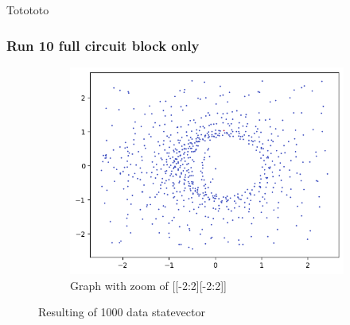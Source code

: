 Totototo

\subsubsection{Run 10 full circuit block only}
\begin{figure}[ht!]
        \centering
        \begin{subfigure}[c]{0.5\textwidth}
                \includegraphics[width=\textwidth]{Chapitre1/Figures/exp1_10_base0_zoom.png}
                \caption{Graph with zoom of [[-2:2][-2:2]]}
        \end{subfigure}%
        \caption{Resulting of 1000 data statevector}
\end{figure}

